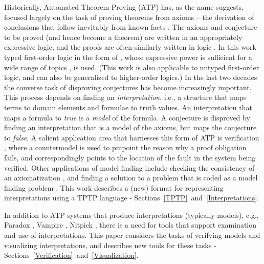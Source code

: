 \documentclass[letterpaper]{article}
\begin{document}
Historically, Automated Theorem Proving (ATP) has, as the name suggests, focused largely on the
task of proving theorems from axioms -- the derivation of conclusions that follow inevitably 
from known facts \cite{RV01-HAR}.
The axioms and conjecture to be proved (and hence become a theorem) are written in an 
appropriately expressive logic, and the proofs are often similarly written in logic \cite{SS+06}.
In this work typed first-order logic in the form of \cite{Wal83,Sch85,Coh87},
whose expressive power is sufficient for a wide range of topics \cite{Sut17}, is used.
(This work is also applicable to untyped first-order logic,
and can also be generalized to higher-order logics.)
In the last two decades the converse task of disproving conjectures
has become increasingly important.
This process depends on finding an {\em interpretation}, i.e., a structure that maps terms 
to domain elements and formulae to truth values.
An interpretation that maps a formula to {\em true} is a {\em model} of the formula.
A conjecture is disproved by finding an interpretation that is a model of the axioms, but 
maps the conjecture to {\em false}.
A salient application area that harnesses this form of ATP is verification \cite{DKW08},
where a countermodel is used to pinpoint the reason why a proof obligation fails, and
correspondingly points to the location of the fault in the system being verified.
Other applications of model finding include checking the consistency of an axiomatization 
\cite{SS+17}, and finding a solution to a problem that is coded as a model finding problem 
\cite{Win82}.
This work describes a (new) format for representing interpretations using a TPTP language -
Sections~\ref{TPTP}~and~\ref{Interpretations}.

In addition to ATP systems that produce interpretations (typically models),
e.g., Paradox \cite{CS03}, Vampire \cite{KV13}, Nitpick \cite{BN10-ITP},
there is a need for tools that support examination and use of interpretations.
This paper considers the tasks of verifying models and visualizing interpretations, and describes 
new tools for these tasks - Sections~\ref{Verification}~and~\ref{Visualization}.
\end{document}
